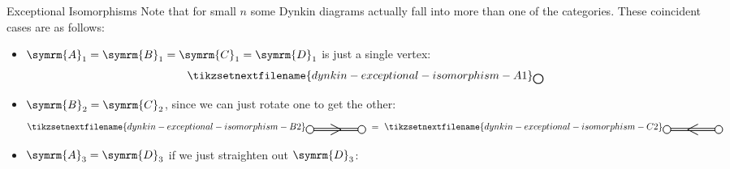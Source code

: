 \documentclass[fleqn]{NotesClass}
\newcommand{\dynkin}[2]{\symrm{#1}_{#2}}
\begin{document}
    \begin{remark}{Exceptional Isomorphisms}{}
        Note that for small \(n\) some Dynkin diagrams actually fall into more than one of the categories.
        These coincident cases are as follows:
        \begin{itemize}
            \item \(\dynkin{A}{1} = \dynkin{B}{1} = \dynkin{C}{1} = \dynkin{D}{1}\) is just a single vertex:
            \begin{equation}
                \tikzsetnextfilename{dynkin-exceptional-isomorphism-A1}
                \begin{tikzpicture}[baseline=(current bounding box)]
                    \draw[thick, fill=white] (2, 0) circle [radius=0.15];
                \end{tikzpicture}
            \end{equation}
            \item \(\dynkin{B}{2} = \dynkin{C}{2}\), since we can just rotate one to get the other:
            \begin{equation}
                \tikzsetnextfilename{dynkin-exceptional-isomorphism-B2}
                \begin{tikzpicture}[baseline=(current bounding box)]
                    \draw[thick, yshift=0.04cm] (0, 0) -- (2, 0);
                    \draw[thick, yshift=-0.04cm] (0, 0) -- (2, 0);
                    \draw[thick, fill=white] (0, 0) circle [radius=0.15];
                    \draw[thick, fill=white] (2, 0) circle [radius=0.15];
                    \draw[thick] (0.8, 0.2) -- (1.2, 0) -- (0.8, -0.2);
                \end{tikzpicture}
                \ =\ 
                \tikzsetnextfilename{dynkin-exceptional-isomorphism-C2}
                \begin{tikzpicture}[baseline=(current bounding box)]
                    \draw[thick, yshift=0.04cm] (0, 0) -- (2, 0);
                    \draw[thick, yshift=-0.04cm] (0, 0) -- (2, 0);
                    \draw[thick, fill=white] (0, 0) circle [radius=0.15];
                    \draw[thick, fill=white] (2, 0) circle [radius=0.15];
                    \draw[thick] (1.2, 0.2) -- (0.8, 0) -- (1.2, -0.2);
                \end{tikzpicture}
            \end{equation}
            \item \(\dynkin{A}{3} = \dynkin{D}{3}\) if we just straighten out \(\dynkin{D}{3}\):
            \begin{equation}

\end{equation}
\end{itemize}
\end{remark}
\end{document}
